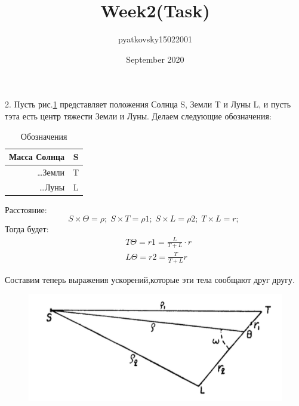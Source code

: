 \documentclass[a4paper,12pt]{article}
\title{Week2(Task)}
\author{pyatkovsky15022001 }
\date{September 2020}
\begin{document}
\maketitle

\section{}

2. Пусть рис.\ref{tab:main_mean} представляет положения Солнца S, Земли T
и Луны L, и пусть тэта есть центр тяжести Земли и Луны. Делаем следующие обозначения:

\begin{table}[!h]
    \begin{center}
        \caption{Обозначения}\label{tab:main_mean} 
        \begin{tabular}{|r|c|}
            \hline Масса Солнца & S \\ \hline
            \dots Земли & T\\ \hline
            \dots Луны & L\\ \hline
        \end{tabular}
    \end{center}
\end{table}


Расстояние:
\begin{equation*}
    S \times \Theta = \rho;\;
    S \times T = \rho1;\;
    S \times L = \rho2;\;
    T \times L = r;\;
\end{equation*}
Тогда будет:
\begin{equation}
    \begin{aligned}
        &T \Theta = r1 = \frac{L}{T +L} \cdot r\\
        &L \Theta = r2 = \frac{T}{T +L} r
    \end{aligned}
\end{equation}

Составим теперь выражения ускорений,которые эти тела сообщают друг другу.

\begin{figure}[bhtp]
    \centering
    \includegraphics{21.png}
    \caption{}
    \label{fig:21}
\end{figure}
\end{document}

